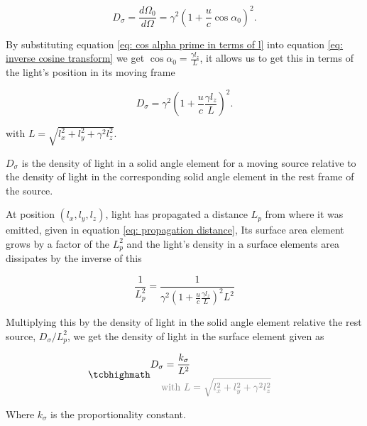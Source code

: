 \begin{derivation}
	\begin{equation}
		D_{\sigma} = \frac{d\Omega_0}{d\Omega} = {\gamma}^2\left(1 + \dfrac{u}{c}\cos{\alpha_0}\right)^2.
	\end{equation}

	By substituting equation \eqref{eq: cos alpha prime in terms of l} into equation \eqref{eq: inverse cosine transform} we get $\cos\alpha_0=\frac{\gamma l_{z}}{L}$, it allows us to get this in terms of the light's position in its moving frame

	\begin{equation}
		D_{\sigma} = {\gamma}^2\left(1 + \dfrac{u}{c}\frac{\gamma l_{z}}{L}\right)^2.
	\end{equation}

	with $L = \sqrt{l^2_{x} + l^2_{y} + \gamma^2 l^2_{z}}$.

	$D_{\sigma}$ is the density of light in a solid angle element for a moving source relative to the density of light in the corresponding solid angle element in the rest frame of the source.

\end{derivation}

At position $(l_{x},l_{y},l_{z})$, light has propagated a distance $L_p$ from where it was emitted, given in equation \eqref{eq: propagation distance},
Its surface area element grows by a factor of the $L_p^2$ and the light's density in a surface elements area dissipates by the inverse of this

\begin{equation}
	\frac{1}{L_p^2} = \frac{1}{\gamma^2 \left( 1 + \frac{u}{c} \frac{\gamma l_z}{L} \right)^2 L^2}
\end{equation}

Multiplying this by the density of light in the solid angle element relative the rest source, $D_{\sigma}/L_p^2$, we get the density of light in the surface element given as

\begin{equation}
	\label{eq: denisty of light in surface element}
	\mhl{
		\begin{aligned}
			D_{\sigma} = \frac{k_{\sigma}}{L^2} \\
			\color{gray} \text{with } L & \color{gray}= \sqrt{l^2_{x} + l^2_{y} + \gamma^2 l^2_{z}}
		\end{aligned}
	}
\end{equation}

Where $k_{\sigma}$ is the proportionality constant.

